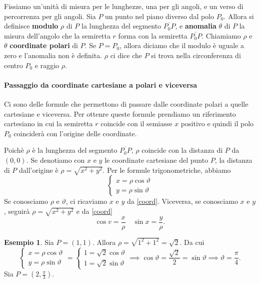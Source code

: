 \documentclass{article}
\theoremstyle{plain}
\theoremstyle{definition}
\newtheorem{exmp}{Esempio}[section]
\theoremstyle{remark}
\begin{document}
\vspace{10pt}
Fissiamo un'unità di misura per le lunghezze, una per gli angoli, e un verso di percorrenza per gli angoli.
Sia $P$ un punto nel piano diverso dal polo $P_0$.
Allora si definisce \textbf{modulo} $\rho$ di $P$ la lunghezza del segmento $\overline{P_0P}$, e 
\textbf{anomalia} $\theta$ di $P$ la misura dell'angolo che la semiretta $r$ forma con la semiretta $\overline{P_0P}$.
Chiamiamo $\rho$ e $\theta$ \textbf{coordinate polari} di $P$.
Se $P=P_0$, allora diciamo che il modulo è uguale a zero e l'anomalia non è definita.
$\rho$ ci dice che $P$ si trova nella circonferenza di centro $P_0$ e raggio $\rho$.

\paragraph{Passaggio da coordinate cartesiane a polari e viceversa}
Ci sono delle formule che permettono di passare dalle coordinate polari a quelle cartesiane e viceversa. 
Per ottenre queste formule prendiamo un riferimento cartesiano in cui la semiretta $r$ coincide con il semiasse $x$ positivo e quindi il polo $P_0$ coinciderà con l'origine delle coordinate.

Poichè $\rho$ è la lunghezza del segmento $\overline{P_0P}$, $\rho$ coincide con la distanza di $P$ da $(0,0)$. 
Se denotiamo con $x$ e $y$ le coordinate cartesiane del punto $P$, 
la distanza di $P$ dall'origine è $\rho=\sqrt{x^2+y^2}$.
Per le formule trigonometriche, abbiamo
\begin{equation}
    \begin{cases}
        x=\rho\cos \vartheta\\
        y=\rho\sin \vartheta
    \end{cases}\label{coord}  
\end{equation}
Se conosciamo $\rho$ e $\vartheta$, ci ricaviamo $x$ e $y$ da \ref{coord}. 
Viceversa, se conosciamo $x$ e $y$, seguirà $\rho=\sqrt{x^2+y^2}$ e da \ref{coord} 
\[\cos v=\dfrac{x}{\rho}\quad \sin x=\dfrac{y}{\rho}.\]

\vspace{10pt}

\begin{exmp}
    Sia $P=(1,1)$. Allora $\rho=\sqrt{1^2+1^2}=\sqrt{2}$. Da cui 
    \[\begin{cases}
        x=\rho\cos\vartheta\\
        y=\rho\sin\vartheta
    \end{cases}=\begin{cases}
        1=\sqrt{2}\cos\vartheta\\
        1=\sqrt{2}\sin\vartheta
    \end{cases}\implies \cos\vartheta=\dfrac{\sqrt{2}}{2}=\sin\vartheta\implies \vartheta=\dfrac{\pi}{4}.\]
    Sia $P=(2,\frac{\pi}{3})$.
\end{exmp}
\end{document}
